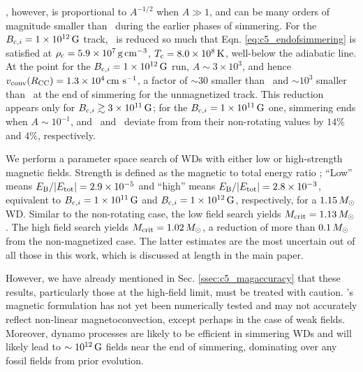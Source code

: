\vconv, however, is proportional to $A^{-1/2}$ when $A \gg 1$, and can be many orders of magnitude smaller than \vconvzero\ during the earlier phases of simmering.  For the $\Binit = 1\times10^{12}\,\mrm{G}$ track, \vconv\ is reduced so much that Eqn. \ref{eq:c5_endofsimmering} is satisfied at $\rhoc = 5.9\times10^7\,\gcc$, $\Tc = 8.0\times10^8\,\mrm{K}$, well-below the adiabatic \citeal{wooswk04} line.  At the \citeal{wooswk04} point for the $\Binit = 1\times10^{12}\,\mrm{G}$ run, $A \sim 3\times10^3$, and hence $\vconvrcc = 1.3\times10^{4}\,\cmpsec$, a factor of $\sim30$ smaller than \vconvzero\ and $\sim10^3$ smaller than \vconvrcc\ at the end of simmering for the unmagnetized track.  This reduction appears only for $\Binit \gtrsim 3\times10^{11}\,\mrm{G}$; for the $\Binit = 1\times10^{11}\,\mrm{G}$ one, simmering ends when $A \sim 10^{-1}$, and \rhoc\ and \Tc\ deviate from from their non-rotating values by $14$\% and $4$\%, respectively.


We perform a parameter space search of WDs with either low or high-strength magnetic fields.  Strength is defined as the magnetic to total energy ratio \EBEtot; ``Low'' means $\EBEtot = 2.9\times10^{-5}$ and ``high'' means $\EBEtot = 2.8\times10^{-3}$, equivalent to $\Binit = 1\times10^{11}\,\mrm{G}$ and $\Binit = 1\times10^{12}\,\mrm{G}$, respectively, for a $1.15\,\Msun$ WD.  Similar to the non-rotating case, the low field search yields $\Mcrit = 1.13\,\Msun$.  The high field search yields $\Mcrit = 1.02\,\Msun$, a reduction of more than $0.1\,\Msun$ from the non-magnetized case.  The latter estimates are the most uncertain out of all those in this work, which is discussed at length in the main paper.  




However, we have already mentioned in Sec. \ref{ssec:c5_magaccuracy} that these results, particularly those at the high-field limit, must be treated with caution.  \citeal{stev79}'s magnetic formulation has not yet been numerically tested and may not accurately reflect non-linear magnetoconvection, except perhaps in the case of weak fields.  Moreover, dynamo processes are likely to be efficient in simmering WDs and will likely lead to $\sim10^{12}\,\mathrm{G}$ fields near the end of simmering, dominating over any fossil fields from prior evolution.

